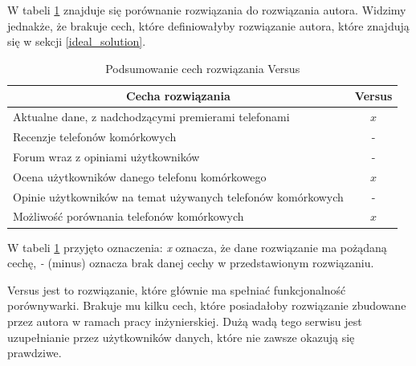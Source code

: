 W tabeli \ref{comparison_versus} znajduje się porównanie rozwiązania do rozwiązania autora. Widzimy jednakże, że brakuje cech, które definiowałyby rozwiązanie autora, które znajdują się w sekcji \ref{ideal_solution}.
\begin{table}[H]
    \centering
    \begin{tabular}{|l|c|}
        \hline
        \multicolumn{1}{|c|}{Cecha rozwiązania} & \multicolumn{1}{c|}{Versus} \\ \hline
        Aktualne dane, z nadchodzącymi premierami telefonami & $x$ \\ \hline
        Recenzje telefonów komórkowych & - \\ \hline
        Forum wraz z opiniami użytkowników & - \\ \hline
        Ocena użytkowników danego telefonu komórkowego & $x$ \\ \hline
        Opinie użytkowników na temat używanych telefonów komórkowych & - \\ \hline
        Możliwość porównania telefonów komórkowych & $x$ \\ \hline
    \end{tabular}
    \caption{Podsumowanie cech rozwiązania Versus}
    \label{comparison_versus}
\end{table}
W tabeli \ref{comparison_versus} przyjęto oznaczenia: \textit{x} oznacza, że dane rozwiązanie ma pożądaną cechę, \textit{-} (minus) oznacza brak danej cechy w przedstawionym rozwiązaniu.

Versus jest to rozwiązanie, które głównie ma spełniać funkcjonalność porównywarki. Brakuje mu kilku cech, które posiadałoby rozwiązanie zbudowane przez autora w ramach pracy inżynierskiej. Dużą wadą tego serwisu jest uzupełnianie przez użytkowników danych, które nie zawsze okazują się prawdziwe.
